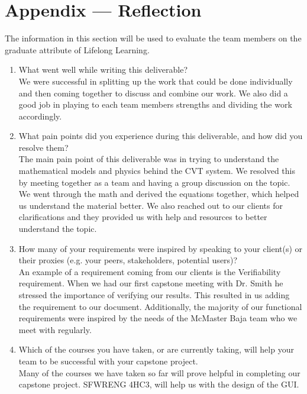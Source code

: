 \documentclass[12pt]{article}
\begin{document}
\newpage{}
\section*{Appendix --- Reflection}


The information in this section will be used to evaluate the team members on the
graduate attribute of Lifelong Learning.  



\begin{enumerate}
  \item What went well while writing this deliverable?
  \\
  We were successful in splitting up the work that could be done individually and then coming together to discuss and combine our work.
  We also did a good job in playing to each team members strengths and dividing the work accordingly. 
  \item What pain points did you experience during this deliverable, and how did
  you resolve them?
  \\
  The main pain point of this deliverable was in trying to understand the mathematical models and physics behind the CVT system.
  We resolved this by meeting together as a team and having a group discussion on the topic.
  We went through the math and derived the equations together, which helped us understand the material better.
  We also reached out to our clients for clarifications and they provided us with help and resources to better understand the topic.
  \item How many of your requirements were inspired by speaking to your
  client(s) or their proxies (e.g. your peers, stakeholders, potential users)?
  \\
  An example of a requirement coming from our clients is the Verifiability requirement.
  When we had our first capstone meeting with Dr. Smith he stressed the importance of verifying our results.
  This resulted  in us adding the requirement to our document.
  Additionally, the majority of our functional requirements were inspired by the needs of the McMaster Baja team who we meet with regularly.
  \item Which of the courses you have taken, or are currently taking, will help
  your team to be successful with your capstone project.
  \\
  Many of the courses we have taken so far will prove helpful in completing our capstone project.
  SFWRENG 4HC3, will help us with the design of the GUI.

\end{enumerate}
\end{document}
